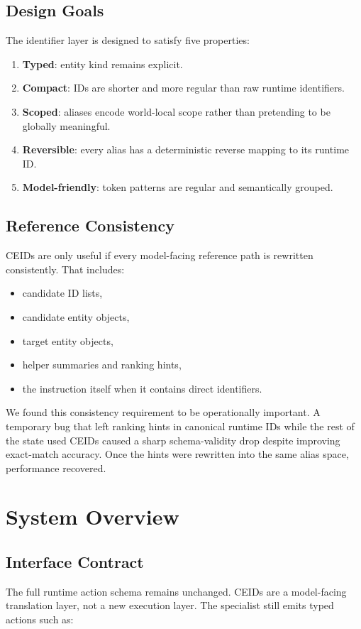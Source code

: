 \documentclass[manuscript,screen,review]{jair}
\begin{document}
\subsection{Design Goals}
The identifier layer is designed to satisfy five properties:
\begin{enumerate}[leftmargin=*,itemsep=0.25em]
  \item \textbf{Typed}: entity kind remains explicit.
  \item \textbf{Compact}: IDs are shorter and more regular than raw runtime identifiers.
  \item \textbf{Scoped}: aliases encode world-local scope rather than pretending to be globally meaningful.
  \item \textbf{Reversible}: every alias has a deterministic reverse mapping to its runtime ID.
  \item \textbf{Model-friendly}: token patterns are regular and semantically grouped.
\end{enumerate}

\subsection{Reference Consistency}
CEIDs are only useful if every model-facing reference path is rewritten consistently. That includes:
\begin{itemize}[leftmargin=*]
  \item candidate ID lists,
  \item candidate entity objects,
  \item target entity objects,
  \item helper summaries and ranking hints,
  \item the instruction itself when it contains direct identifiers.
\end{itemize}

We found this consistency requirement to be operationally important. A temporary bug that left ranking hints in canonical runtime IDs while the rest of the state used CEIDs caused a sharp schema-validity drop despite improving exact-match accuracy. Once the hints were rewritten into the same alias space, performance recovered.

\section{System Overview}
\subsection{Interface Contract}
The full runtime action schema remains unchanged. CEIDs are a model-facing translation layer, not a new execution layer. The specialist still emits typed actions such as:
\end{document}
